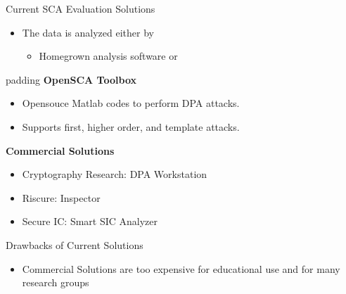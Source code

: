 \documentclass[xcolor=pdftex,dvipsnames,table,final]{beamer}
\begin{document}
\begin{frame}[fragile]{}
\begin{columns}[t]
\begin{column}{.31\linewidth}
\begin{block}{Current SCA Evaluation Solutions}
        \begin{itemize}
            \item The data is analyzed either by
            \begin{itemize}
                \item Homegrown analysis software or
            \end{itemize}
        \end{itemize}
        \begin{center}
        \begin{minipage}[t]{0.9\linewidth}  
        \begin{beamercolorbox}[rounded=true]{padding}
          \textbf{OpenSCA Toolbox}
          {\small
          \begin{itemize}
            \item Opensouce Matlab codes to perform DPA attacks.
            \item Supports first, higher order, and template attacks.
          \end{itemize}
        }
        \end{beamercolorbox}
        \end{minipage}
        \end{center}
        {\large\textbf{Commercial Solutions}}%
        \begin{itemize}
          \item Cryptography Research: DPA Workstation\texttrademark
          \item Riscure: Inspector
          \item Secure IC: Smart SIC Analyzer 
        \end{itemize}
      \end{block}
          \begin{block}{Drawbacks of Current Solutions}   
          \vspace{-1ex}
            \begin{itemize}
              \item Commercial Solutions are too expensive for educational use and for
                    many research groups


\end{itemize}
\end{block}
\end{column}
\end{columns}
\end{frame}
\end{document}

